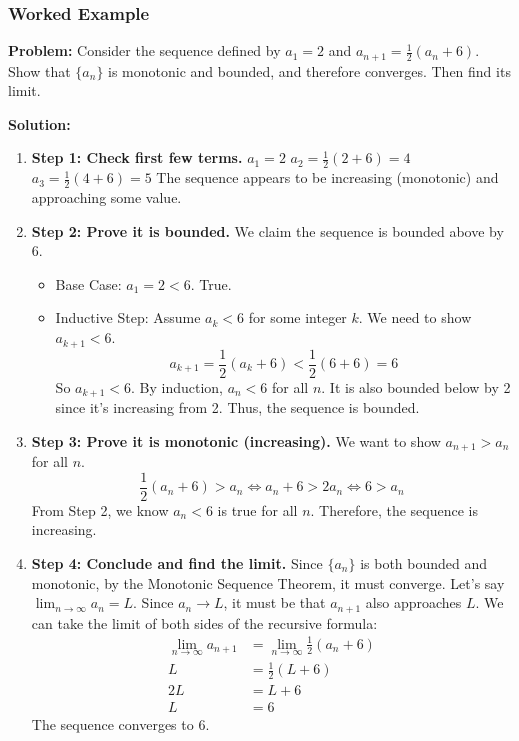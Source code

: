 \documentclass{article}
\begin{document}
\subsubsection{Worked Example}
\textbf{Problem:} Consider the sequence defined by $a_1 = 2$ and $a_{n+1} = \frac{1}{2}\left(a_n + 6\right)$. Show that $\{a_n\}$ is monotonic and bounded, and therefore converges. Then find its limit.

\textbf{Solution:}
\begin{enumerate}
    \item \textbf{Step 1: Check first few terms.}
    $a_1 = 2$
    $a_2 = \frac{1}{2}(2+6) = 4$
    $a_3 = \frac{1}{2}(4+6) = 5$
    The sequence appears to be increasing (monotonic) and approaching some value.

    \item \textbf{Step 2: Prove it is bounded.}
    We claim the sequence is bounded above by 6.
    \begin{itemize}
        \item Base Case: $a_1 = 2 < 6$. True.
        \item Inductive Step: Assume $a_k < 6$ for some integer $k$. We need to show $a_{k+1} < 6$.
        \[ a_{k+1} = \frac{1}{2}(a_k + 6) < \frac{1}{2}(6 + 6) = 6 \]
        So $a_{k+1} < 6$. By induction, $a_n < 6$ for all $n$. It is also bounded below by 2 since it's increasing from 2. Thus, the sequence is bounded.
    \end{itemize}
    
    \item \textbf{Step 3: Prove it is monotonic (increasing).}
    We want to show $a_{n+1} > a_n$ for all $n$.
    \[ \frac{1}{2}(a_n + 6) > a_n \iff a_n + 6 > 2a_n \iff 6 > a_n \]
    From Step 2, we know $a_n < 6$ is true for all $n$. Therefore, the sequence is increasing.

    \item \textbf{Step 4: Conclude and find the limit.}
    Since $\{a_n\}$ is both bounded and monotonic, by the Monotonic Sequence Theorem, it must converge. Let's say $\lim_{n \to \infty} a_n = L$.
    Since $a_n \to L$, it must be that $a_{n+1}$ also approaches $L$. We can take the limit of both sides of the recursive formula:
    \begin{align*}
        \lim_{n \to \infty} a_{n+1} &= \lim_{n \to \infty} \frac{1}{2}(a_n + 6) \\
        L &= \frac{1}{2}(L+6) \\
        2L &= L+6 \\
        L &= 6
    \end{align*}
    The sequence converges to 6.
\end{enumerate}
\end{document}
